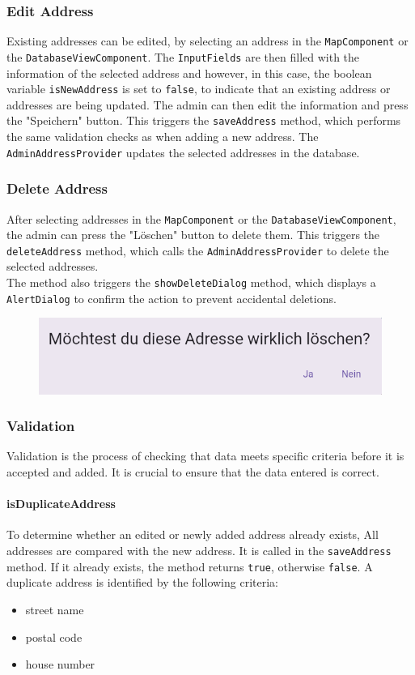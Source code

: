 \subsubsection{Edit Address}
\sloppy %
Existing addresses can be edited, by selecting an address in the \texttt{MapComponent} or the \texttt{DatabaseViewComponent}. The \texttt{InputFields} are then filled with the information of the selected address and however, in this case, the boolean variable \texttt{isNewAddress} is set to \texttt{false}, to indicate that an existing address or addresses are being updated. The admin can then edit the information and press the "Speichern" button. This triggers the \texttt{saveAddress} method, which performs the same validation checks as when adding a new address. The \texttt{AdminAddressProvider} updates the selected addresses in the database.

\subsubsection{Delete Address}
After selecting addresses in the \texttt{MapComponent} or the \texttt{DatabaseViewComponent}, the admin can press the "Löschen" button to delete them. This triggers the \texttt{deleteAddress} method, which calls the \texttt{AdminAddressProvider} to delete the selected addresses.\\The method also triggers the \texttt{showDeleteDialog} method, which displays a \texttt{AlertDialog} to confirm the action to prevent accidental deletions.

\begin{figure}[H]
    \centering
    \includegraphics[width=0.6\linewidth]{images/AdminPanel/DeleteDialog.png}
\end{figure}

\subsubsection{Validation}
Validation is the process of checking that data meets specific criteria before it is accepted and added. It is crucial to ensure that the data entered is correct.
\paragraph{isDuplicateAddress}
To determine whether an edited or newly added address already exists, All addresses are compared with the new address. It is called in the \texttt{saveAddress} method.  If it already exists, the method returns \texttt{true}, otherwise \texttt{false}. A duplicate address is identified by the following criteria:
\begin{itemize}
    \item street name
    \item postal code
    \item house number
\end{itemize}

